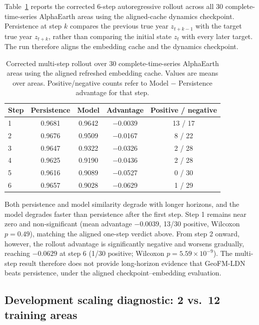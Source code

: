 \documentclass{article}
\begin{document}
Table~\ref{tab:multistep} reports the corrected 6-step autoregressive rollout across all 30 complete-time-series AlphaEarth areas using the aligned-cache dynamics checkpoint. Persistence at step $k$ compares the previous true year $z_{t+k-1}$ with the target true year $z_{t+k}$, rather than comparing the initial state $z_t$ with every later target. The run therefore aligns the embedding cache and the dynamics checkpoint.

\begin{table}[htbp]
\centering
\caption{Corrected multi-step rollout over 30 complete-time-series AlphaEarth areas using the aligned refreshed embedding cache. Values are means over areas. Positive/negative counts refer to Model $-$ Persistence advantage for that step.}
\label{tab:multistep}
\small
\begin{tabular}{lcccc}
\toprule
Step & Persistence & Model & Advantage & Positive / negative \\
\midrule
1 & 0.9681 & 0.9642 & $-$0.0039 & 13 / 17 \\
2 & 0.9676 & 0.9509 & $-$0.0167 & 8 / 22 \\
3 & 0.9647 & 0.9322 & $-$0.0326 & 2 / 28 \\
4 & 0.9625 & 0.9190 & $-$0.0436 & 2 / 28 \\
5 & 0.9616 & 0.9089 & $-$0.0527 & 0 / 30 \\
6 & 0.9657 & 0.9028 & $-$0.0629 & 1 / 29 \\
\bottomrule
\end{tabular}
\end{table}

Both persistence and model similarity degrade with longer horizons, and the model degrades faster than persistence after the first step. Step 1 remains near zero and non-significant (mean advantage $-0.0039$, 13/30 positive, Wilcoxon $p=0.49$), matching the aligned one-step verdict above. From step 2 onward, however, the rollout advantage is significantly negative and worsens gradually, reaching $-0.0629$ at step 6 (1/30 positive; Wilcoxon $p=5.59\times10^{-9}$). The multi-step result therefore does not provide long-horizon evidence that GeoFM-LDN beats persistence, under the aligned checkpoint--embedding evaluation.

\subsection{Development scaling diagnostic: 2 vs.~12 training areas}
\label{sec:ablation_data}
\end{document}

